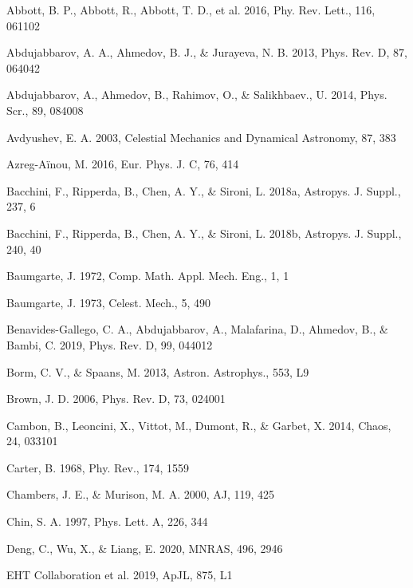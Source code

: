 \documentclass[preprint2]{aastex}
\begin{document}
\begin{thebibliography}{}

  Abbott, B. P., Abbott, R., Abbott, T. D., et al. 2016, Phy. Rev. Lett., 116,
061102

 Abdujabbarov, A. A., Ahmedov, B. J., \& Jurayeva, N. B. 2013, Phys. Rev. D,
87, 064042

 Abdujabbarov, A., Ahmedov, B., Rahimov, O., \& Salikhbaev., U. 2014, Phys. Scr., 89, 084008

 Avdyushev, E. A. 2003, Celestial Mechanics and Dynamical Astronomy, 87, 383

 Azreg-A\"{i}nou, M. 2016, Eur. Phys. J. C, 76, 414

 Bacchini, F., Ripperda, B., Chen, A. Y., \& Sironi, L. 2018a, Astropys. J. Suppl., 237, 6

 Bacchini, F., Ripperda, B., Chen, A. Y., \& Sironi, L. 2018b, Astropys. J. Suppl., 240, 40

  Baumgarte, J. 1972, Comp. Math. Appl. Mech. Eng., 1, 1

  Baumgarte, J. 1973, Celest. Mech., 5, 490

 Benavides-Gallego, C. A., Abdujabbarov, A.,  Malafarina, D., Ahmedov, B., \& Bambi, C. 2019, Phys. Rev.
D, 99, 044012

 Borm, C. V., \& Spaans, M. 2013, Astron. Astrophys., 553, L9

 Brown, J. D. 2006, Phys. Rev. D, 73, 024001

 Cambon, B., Leoncini, X., Vittot, M., Dumont, R., \& Garbet, X. 2014, Chaos, 24, 033101

 Carter, B. 1968, Phy. Rev., 174, 1559

  Chambers, J. E., \&  Murison, M. A. 2000, AJ, 119, 425

 Chin, S. A. 1997, Phys. Lett. A, 226, 344

 Deng, C., Wu, X., \& Liang, E. 2020, MNRAS, 496, 2946

 EHT Collaboration et al. 2019, ApJL, 875, L1


\end{thebibliography}
\end{document}
